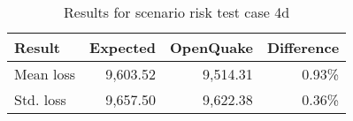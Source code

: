 \begin{table}[htbp]

\centering
\begin{tabular}{ l r r r }

\hline
\rowcolor{anti-flashwhite}
\bf{Result} & \bf{Expected} & \bf{OpenQuake} & \bf{Difference}\\
\hline
Mean loss & 9,603.52 & 9,514.31 & 0.93\% \\
Std. loss & 9,657.50 & 9,622.38 & 0.36\% \\
\hline
\end{tabular}

\caption{Results for scenario risk test case 4d}
\label{tab:result-scenario-risk-4d}
\end{table}